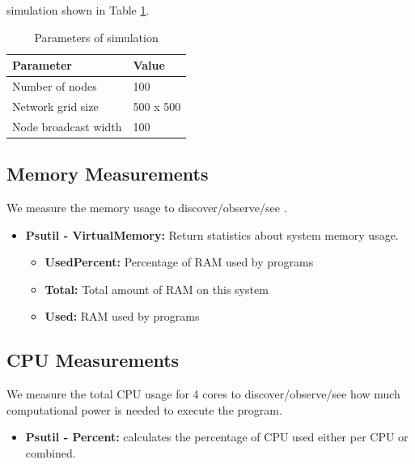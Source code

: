 \documentclass[USenglish]{uit-thesis}
\begin{document}

simulation shown in Table \ref{tab:simTable}. 

\begin{table}
\centering
\begin{tabular}{|l|l|}
\hline
\textbf{Parameter}       & \textbf{Value} \\ \hline
Number of nodes          & 100            \\ \hline
Network grid size        & 500 x 500      \\ \hline
Node broadcast width     & 100            \\ \hline
\end{tabular}
\caption{Parameters of simulation}
\label{tab:simTable}
\end{table}



\subsection{Memory Measurements} \label{eva:mem_measure}
We measure the memory usage to discover/observe/see . 


\begin{itemize}
\item \textbf{Psutil - VirtualMemory:} Return statistics about system memory usage.
	\begin{itemize}
	\item \textbf{UsedPercent:} Percentage of RAM used by programs
	\item \textbf{Total:} Total amount of RAM on this system
	\item \textbf{Used:} RAM used by programs
	\end{itemize}	
\end{itemize}


\subsection{CPU Measurements} \label{eva:cpu_measure}
We measure the total CPU usage for 4 cores to discover/observe/see how much computational power is needed to execute the program. 


\begin{itemize}
\item \textbf{Psutil - Percent:} calculates the percentage of CPU used either per CPU or combined.
\end{itemize}
\end{document}
